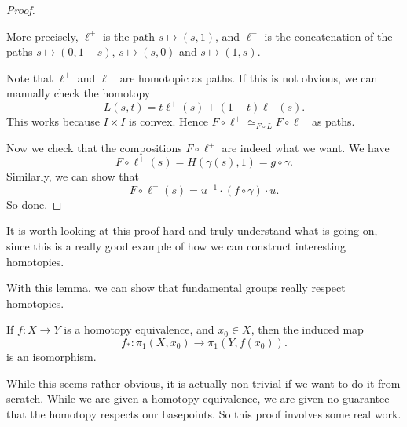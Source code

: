 \documentclass[a4paper]{article}
\begin{document}
\begin{proof}
\begin{center}
  \end{center}
  More precisely, $\ell^+$ is the path $s\mapsto (s, 1)$, and $\ell^-$ is the concatenation of the paths $s\mapsto (0, 1- s)$, $s \mapsto (s, 0)$ and $s\mapsto (1, s)$.

  Note that $\ell^+$ and $\ell^-$ are homotopic as paths. If this is not obvious, we can manually check the homotopy
  \[
    L(s, t) = t\ell^+(s) + (1 - t)\ell^- (s).
  \]
  This works because $I\times I$ is convex. Hence $F\circ \ell^+\simeq_{F\circ L} F\circ \ell^-$ as paths.

  Now we check that the compositions $F\circ \ell^{\pm}$ are indeed what we want. We have
  \[
    F\circ \ell^+ (s) = H(\gamma(s), 1) = g\circ \gamma.
  \]
  Similarly, we can show that
  \[
    F\circ \ell^-(s) = u^{-1}\cdot (f\circ \gamma)\cdot u.
  \]
  So done.
\end{proof}
It is worth looking at this proof hard and truly understand what is going on, since this is a really good example of how we can construct interesting homotopies.

With this lemma, we can show that fundamental groups really respect homotopies.

\begin{thm}
  If $f: X\to Y$ is a homotopy equivalence, and $x_0 \in X$, then the induced map
  \[
    f_*: \pi_1(X, x_0) \to \pi_1(Y, f(x_0)).
  \]
  is an isomorphism.
\end{thm}
While this seems rather obvious, it is actually non-trivial if we want to do it from scratch. While we are given a homotopy equivalence, we are given no guarantee that the homotopy respects our basepoints. So this proof involves some real work.
\end{document}
